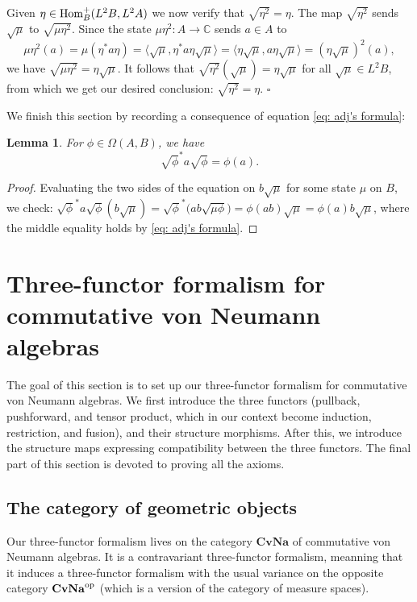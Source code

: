 \documentclass[10pt,a4paper,oneside]{amsart}
\newtheorem{lemma}[theorem]{Lemma}
\theoremstyle{remark}
\theoremstyle{definition}
\newcommand{\tn}[1]{\textnormal{#1}}
\newcommand{\Hom}{\textnormal{Hom}}
\newcommand{\cvna}{\mathbf{CvNa}}
\newcommand{\op}{\tn{op}}
\newcommand{\srmu}{\sqrt{\mu}}
\newcommand{\homtocond}[1]{#1^2}
\begin{document}
    Given $\eta\in \Hom^\tn{+}_B(L^2B, L^2A)$ we now verify that $\sqrt{\eta^2}=\eta$.  The map $\sqrt{\homtocond{\eta}}$ sends $\srmu$ to $\sqrt{\mu \homtocond{\eta}}$. Since the state $\mu \homtocond{\eta}:A\to \mathbb C$ sends $a\in A$ to
	$$
	\mu\homtocond{\eta}(a)=\mu(\eta^* a \eta ) = \langle \sqrt{\mu}, \eta^* a \eta \sqrt{\mu}\rangle =\langle \eta \srmu , a \eta \srmu \rangle= \homtocond{(\eta \srmu)}(a),
	$$
    we have $\sqrt{\mu\homtocond{\eta}}=\eta\sqrt{\mu}$.
    It follows that $\sqrt{\homtocond{\eta}}(\srmu)=\eta\sqrt{\mu}$ for all $\sqrt{\mu}\in L^2B$, from which we get our desired conclusion: $\sqrt{\homtocond{\eta}}=\eta$.
\hfill $\square$
\medskip

We finish this section by recording a consequence of equation \eqref{eq: adj's formula}:

\begin{lemma}\label{last lemma}
For $\phi\in\Omega(A,B)$, we have
\begin{equation*}
\sqrt{\phi}^* a \sqrt{\phi} = \phi(a).
\end{equation*}
\end{lemma}

\begin{proof}
Evaluating the two sides of the equation on $b\sqrt{\mu}$ for some state $\mu$ on $B$, we check:
$\sqrt{\phi}^* a \sqrt{\phi}(b\sqrt{\mu}) 
=
\sqrt{\phi}^*\big(ab\sqrt{\mu\phi}\big)
= \phi(ab)\sqrt{\mu}
= \phi(a)b\sqrt{\mu}$,
where the middle equality holds by \eqref{eq: adj's formula}.
\end{proof}



\section{Three-functor formalism for commutative von Neumann algebras}\label{sec4}
The goal of this section is to set up our three-functor formalism for commutative von Neumann algebras.  We first introduce the three functors (pullback, pushforward, and tensor product, which in our context become induction, restriction, and fusion), and their structure morphisms. After this, we introduce the structure maps expressing compatibility between the three functors. The final part of this section is devoted to proving all the axioms. 

\subsection{The category of geometric objects}
Our three-functor formalism lives on the category $\cvna$ of commutative von Neumann algebras. It is a contravariant three-functor formalism, meanning that it induces a three-functor formalism with the usual variance on the opposite category $\cvna^\op$ (which is a version of the category of measure spaces).
\end{document}
